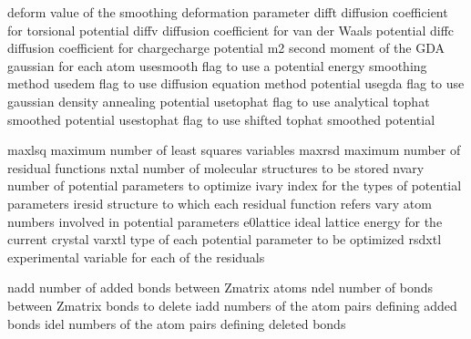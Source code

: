 \documentclass[letterpaper,11pt,english]{sphinxmanual}
\begin{document}
\sphinxAtStartPar
{}

\begin{sphinxVerbatim}[commandchars=\\\{\}]
deform          value of the smoothing deformation parameter
difft           diffusion coefficient for torsional potential
diffv           diffusion coefficient for van der Waals potential
diffc           diffusion coefficient for charge\PYGZhy{}charge potential
m2              second moment of the GDA gaussian for each atom
use\PYGZus{}smooth      flag to use a potential energy smoothing method
use\PYGZus{}dem         flag to use diffusion equation method potential
use\PYGZus{}gda         flag to use gaussian density annealing potential
use\PYGZus{}tophat      flag to use analytical tophat smoothed potential
use\PYGZus{}stophat     flag to use shifted tophat smoothed potential
\end{sphinxVerbatim}

\sphinxAtStartPar
{}

\begin{sphinxVerbatim}[commandchars=\\\{\}]
maxlsq          maximum number of least squares variables
maxrsd          maximum number of residual functions
nxtal           number of molecular structures to be stored
nvary           number of potential parameters to optimize
ivary           index for the types of potential parameters
iresid          structure to which each residual function refers
vary            atom numbers involved in potential parameters
e0\PYGZus{}lattice      ideal lattice energy for the current crystal
varxtl          type of each potential parameter to be optimized
rsdxtl          experimental variable for each of the residuals
\end{sphinxVerbatim}

\sphinxAtStartPar
{}

\begin{sphinxVerbatim}[commandchars=\\\{\}]
nadd            number of added bonds between Z\PYGZhy{}matrix atoms
ndel            number of bonds between Z\PYGZhy{}matrix bonds to delete
iadd            numbers of the atom pairs defining added bonds
idel            numbers of the atom pairs defining deleted bonds
\end{sphinxVerbatim}
\end{document}
